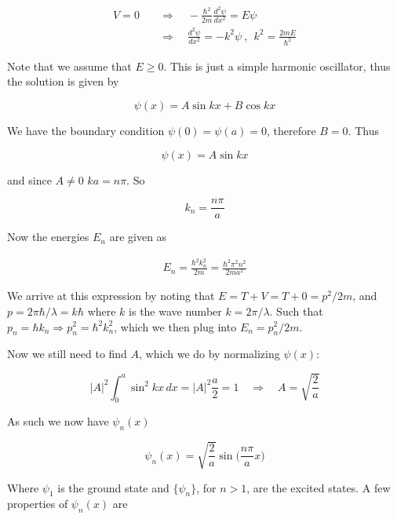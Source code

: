\documentclass[a4paper]{article}
\begin{document}
\begin{align}
	V=0\quad&\Rightarrow\quad -\frac{\hbar^2}{2m}\frac{d^2\psi}{dx^2}=E\psi \\[1em]
	&\Rightarrow\quad \frac{d^2\psi}{dx^2}=-k^2\psi\ ,\ \ k^2=\frac{2mE}{\hbar^2} 
\end{align}

Note that we assume that $E\ge 0$. This is just a simple harmonic oscillator, thus the solution is given by

\begin{equation}
	\psi(x)=A\sin kx+B\cos kx
\end{equation} 

We have the boundary condition $\psi(0)=\psi(a)=0$, therefore $B=0$. Thus 

\begin{equation}
	\psi(x)=A\sin kx
\end{equation}

and since $A\not=0$ $ka=n\pi$. So

\begin{equation}
	k_n=\frac{n\pi}{a}
\end{equation}

Now the energies $E_n$ are given as

\begin{align}
	E_n=\frac{\hbar^2k_n^2}{2m}=\frac{\hbar^2\pi^2n^2}{2ma^2}
\end{align}

We arrive at this expression by noting that $E=T+V=T+0=p^2/2m$, and $p=2\pi\hbar/\lambda=k\hbar$ where $k$ is the wave number $k=2\pi/\lambda$. Such that $p_n=\hbar k_n\Rightarrow p_n^2=\hbar^2k_n^2$, which we then plug into $E_n=p_n^2/2m$.

\bigskip

Now we still need to find $A$, which we do by normalizing $\psi(x)$:

\begin{equation}
	|A|^2\int_0^a\sin^2 kx\,dx=|A|^2\frac{a}{2}=1\quad\Rightarrow\quad A=\sqrt{\frac{2}{a}}
\end{equation}

As such we now have $\psi_n(x)$

\begin{equation}
	\psi_n(x)=\sqrt{\frac{2}{a}}\sin\bigg(\frac{n\pi}{a}x\bigg)
\end{equation}

Where $\psi_1$ is the ground state and $\{\psi_n\}$, for $n>1$, are the excited states. A few properties of $\psi_n(x)$ are
\end{document}
